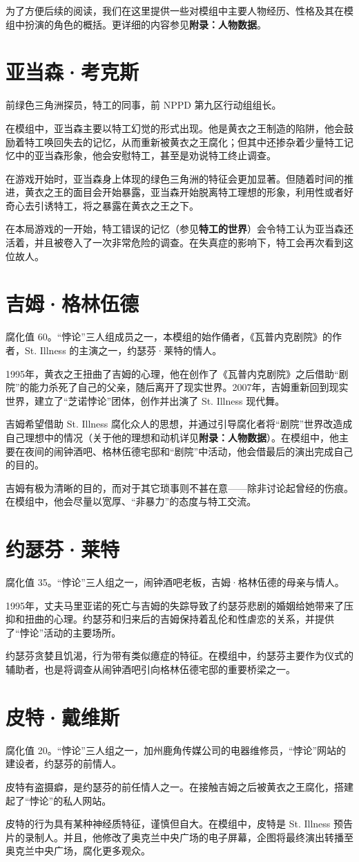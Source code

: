 为了方便后续的阅读，我们在这里提供一些对模组中主要人物经历、性格及其在模组中扮演的角色的概括。更详细的内容参见\textbf{附录：人物数据}。

\section{亚当森·考克斯}

前绿色三角洲探员，特工的同事，前 NPPD 第九区行动组组长。

在模组中，亚当森主要以特工幻觉的形式出现。他是黄衣之王制造的陷阱，他会鼓励着特工唤回失去的记忆，从而重新被黄衣之王腐化；但其中还掺杂着少量特工记忆中的亚当森形象，他会安慰特工，甚至是劝说特工终止调查。

在游戏开始时，亚当森身上体现的绿色三角洲的特征会更加显著。但随着时间的推进，黄衣之王的面目会开始暴露，亚当森开始脱离特工理想的形象，利用性或者好奇心去引诱特工，将之暴露在黄衣之王之下。

在本局游戏的一开始，特工错误的记忆（参见\textbf{特工的世界}）会令特工认为亚当森还活着，并且被卷入了一次非常危险的调查。在失真症的影响下，特工会再次看到这位故人。

\section{吉姆·格林伍德}

腐化值 60。“悖论”三人组成员之一，本模组的始作俑者，《瓦普内克剧院》的作者，St. Illness 的主演之一，约瑟芬·莱特的情人。

1995年，黄衣之王扭曲了吉姆的心理，他在创作了《瓦普内克剧院》之后借助“剧院”的能力杀死了自己的父亲，随后离开了现实世界。2007年，吉姆重新回到现实世界，建立了“芝诺悖论”团体，创作并出演了 St. Illness 现代舞。

吉姆希望借助 St. Illness 腐化众人的思想，并通过引导腐化者将“剧院”世界改造成自己理想中的情况（关于他的理想和动机详见\textbf{附录：人物数据}）。在模组中，他主要在夜间的闹钟酒吧、格林伍德宅邸和“剧院”中活动，他会借最后的演出完成自己的目的。

吉姆有极为清晰的目的，而对于其它琐事则不甚在意——除非讨论起曾经的伤痕。在模组中，他会尽量以宽厚、“非暴力”的态度与特工交流。

\section{约瑟芬·莱特}

腐化值 35。“悖论”三人组之一，闹钟酒吧老板，吉姆·格林伍德的母亲与情人。

1995年，丈夫马里亚诺的死亡与吉姆的失踪导致了约瑟芬悲剧的婚姻给她带来了压抑和扭曲的心理。约瑟芬和归来后的吉姆保持着乱伦和性虐恋的关系，并提供了“悖论”活动的主要场所。

约瑟芬贪婪且饥渴，行为带有类似癔症的特征。在模组中，约瑟芬主要作为仪式的辅助者，也是将调查从闹钟酒吧引向格林伍德宅邸的重要桥梁之一。

\section{皮特·戴维斯}

腐化值 20。“悖论”三人组之一，加州鹿角传媒公司的电器维修员，“悖论”网站的建设者，约瑟芬的前情人。

皮特有盗摄癖，是约瑟芬的前任情人之一。在接触吉姆之后被黄衣之王腐化，搭建起了“悖论”的私人网站。

皮特的行为具有某种神经质特征，谨慎但自大。在模组中，皮特是 St. Illness 预告片的录制人。并且，他修改了奥克兰中央广场的电子屏幕，企图将最终演出转播至奥克兰中央广场，腐化更多观众。